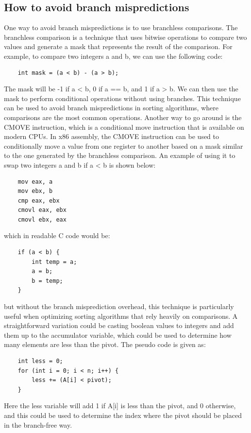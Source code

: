 \documentclass{article}
\begin{document}
\subsection{How to avoid branch mispredictions}
One way to avoid branch mispredictions is to use branchless comparisons. The branchless comparison is a technique that uses bitwise operations to compare two values and generate a mask that represents the result of the comparison.
For example, to compare two integers a and b, we can use the following code:
\begin{verbatim}
    int mask = (a < b) - (a > b);
\end{verbatim}
The mask will be -1 if a < b, 0 if a == b, and 1 if a > b. We can then use the mask to perform conditional operations without using branches.
This technique can be used to avoid branch mispredictions in sorting algorithms, where comparisons are the most common operations.
Another way to go around is the CMOVE instruction, which is a conditional move instruction that is available on modern CPUs. In x86 assembly, the CMOVE instruction can be used to conditionally move a value from one register to another based on a mask similar to the one generated by the branchless comparison.
An example of using it to swap two integers a and b if a < b is shown below:
\begin{verbatim}
    mov eax, a
    mov ebx, b
    cmp eax, ebx
    cmovl eax, ebx
    cmovl ebx, eax
\end{verbatim}
which in readable C code would be:
\begin{verbatim}
    if (a < b) {
        int temp = a;
        a = b;
        b = temp;
    }
\end{verbatim}
but without the branch misprediction overhead, this technique is particularly useful when optimizing sorting algorithms that rely heavily on comparisons.
A straightforward variation could be casting boolean values to integers and add them up to the accumulator variable, which could be used to determine how many elements are less than the pivot.
The pseudo code is given as:
\begin{verbatim}
    int less = 0;
    for (int i = 0; i < n; i++) {
        less += (A[i] < pivot);
    }
\end{verbatim}
Here the less variable will add 1 if A[i] is less than the pivot, and 0 otherwise, and this could be used to determine the index where the pivot should be placed in the branch-free way.
\end{document}
